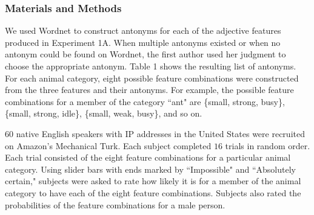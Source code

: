 \documentclass[10pt,letterpaper]{article}
\begin{document}
\subsubsection{Materials and Methods}
We used Wordnet to construct antonyms for each of the adjective features produced in Experiment 1A. When multiple antonyms existed or when no antonym could be found on Wordnet, the first author used her judgment to choose the appropriate antonym. Table 1 shows the resulting list of antonyms. For each animal category, eight possible feature combinations were constructed from the three features and their antonyms. For example, the possible feature combinations for a member of the category ``ant" are \{small, strong, busy\}, \{small, strong, idle\}, \{small, weak, busy\}, and so on.

$60$ native English speakers with IP addresses in the United States were recruited on Amazon's Mechanical Turk. Each subject completed $16$ trials in random order. Each trial consisted of the eight feature combinations for a particular animal category. Using slider bars with ends marked by ``Impossible" and ``Absolutely certain," subjects were asked to rate how likely it is for a member of the animal category to have each of the eight feature combinations. Subjects also rated the probabilities of the feature combinations for a male person.
\end{document}
